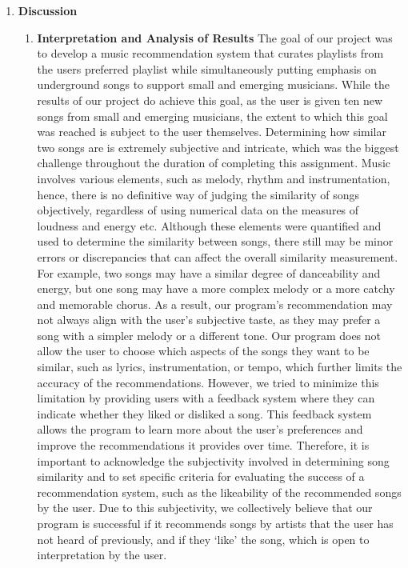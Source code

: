 \documentclass[fontsize=11pt]{article}
\begin{document}
\begin{enumerate}
\item\textbf{Discussion}
\begin{enumerate}
    \item\textbf{Interpretation and Analysis of Results} \newline
    The goal of our project was to develop a music recommendation system that curates playlists from the users preferred playlist while simultaneously putting emphasis on underground songs to support small and emerging musicians. While the results of our project do achieve this goal, as the user is given ten new songs from small and emerging musicians, the extent to which this goal was reached is subject to the user themselves. Determining how similar two songs are is extremely subjective and intricate, which was the biggest challenge throughout the duration of completing this assignment. Music involves various elements, such as melody, rhythm and instrumentation, hence, there is no definitive way of judging the similarity of songs objectively, regardless of using numerical data on the measures of loudness and energy etc. Although these elements were quantified and used to determine the similarity between songs, there still may be minor errors or discrepancies that can affect the overall similarity measurement. For example, two songs may have a similar degree of danceability and energy, but one song may have a more complex melody or a more catchy and memorable chorus. As a result, our program's recommendation may not always align with the user's subjective taste, as they may prefer a song with a simpler melody or a different tone. Our program does not allow the user to choose which aspects of the songs they want to be similar, such as lyrics, instrumentation, or tempo, which further limits the accuracy of the recommendations. However, we tried to minimize this limitation by providing users with a feedback system where they can indicate whether they liked or disliked a song. This feedback system allows the program to learn more about the user's preferences and improve the recommendations it provides over time. Therefore, it is important to acknowledge the subjectivity involved in determining song similarity and to set specific criteria for evaluating the success of a recommendation system, such as the likeability of the recommended songs by the user. Due to this subjectivity, we collectively believe that our program is successful if it recommends songs by artists that the user has not heard of previously, and if they ‘like’ the song, which is open to interpretation by the user. \newline


\end{enumerate}
\end{enumerate}
\end{document}
